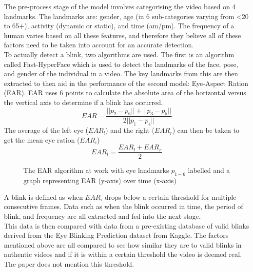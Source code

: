 \documentclass{article}
\begin{document}
The pre-process stage of the model involves categorising the video based on 4 landmarks. The landmarks are: gender, age (in 6 sub-categories varying from \textless 20 to 65+), activity (dynamic or static), and time (am/pm). The frequency of a human varies based on all these features\cite{varying-blink}, and therefore they believe all of these factors need to be taken into account for an accurate detection.\\

To actually detect a blink, two algorithms are used. The first is an algorithm called Fast-HyperFace\cite{ranjan2017hyperface} which is used to detect the landmarks of the face, pose, and gender of the individual in a video. The key landmarks from this are then extracted to then aid in the performance of the second model: Eye-Aspect Ration (EAR). EAR uses 6 points to calculate the absolute area of the horizontal versus the vertical axis to determine if a blink has occurred\cite{EAR}.
\begin{equation}
    EAR=\frac{||p_2-p_6||+||p_3-p_5||}{2||p_1-p_4||}
\end{equation}
The average of the left eye ($EAR_l$) and the right ($EAR_r$) can then be taken to get the mean eye ration ($EAR_i$)
\begin{equation}
    EAR_i = \frac{EAR_l + EAR_r}{2}
\end{equation}
\begin{figure}[H]
    \centering
    \caption{The EAR algorithm at work with eye landmarks $p_{1-6}$ labelled and a graph representing EAR (y-axis) over time (x-axis)}
    \label{fig:EAR}
\end{figure}

A blink is defined as when $EAR_i$ drops below a certain threshold for multiple consecutive frames. Data such as when the blink occurred in time, the period of blink, and frequency are all extracted and fed into the next stage.\\

This data is then compared with data from a pre-existing database of valid blinks derived from the Eye Blinking Prediction dataset from Kaggle\cite{eyeblinkprediction}. The factors mentioned above are all compared to see how similar they are to valid blinks in authentic videos and if it is within a certain threshold the video is deemed real. The paper does not mention this threshold. \\
\end{document}
